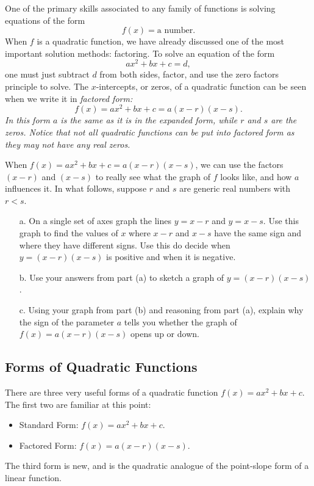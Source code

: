 \par

One of the primary skills associated to any family of functions is solving equations of the form
\[
f(x) = \mbox{a number}.
\]
When $f$ is a quadratic function, we have already discussed one of the most important solution methods: factoring. To solve an equation of the form
\[
ax^2+bx+c = d,
\]
one must just subtract $d$ from both sides, factor, and use the zero factors principle to solve. The $x$-intercepts, or zeros, of a quadratic function can be seen when we write it in \it{factored form}\normalfont:
\[
f(x) = ax^2 + bx+c = a(x-r)(x-s).
\]
In this form $a$ is the same as it is in the expanded form, while $r$ and $s$ are the zeros. Notice that not all quadratic functions can be put into factored form as they may not have any real zeros.

\par
   
\begin{question} When $f(x) = ax^2 + bx + c = a(x-r)(x-s)$, we can use the factors $(x-r)$ and $(x-s)$ to really see what the graph of $f$ looks like, and how $a$ influences it. In what follows, suppose $r$ and $s$ are generic real numbers with $r<s$.
\begin{enumerate}
\item[a.] On a single set of axes graph the lines $y = x-r$ and $y = x-s$. Use this graph to find the values of $x$ where $x-r$ and $x-s$ have the same sign and where they have different signs. Use this do decide when $y=(x-r)(x-s)$ is positive and when it is negative.
\item[b.] Use your answers from part (a) to sketch a graph of $y = (x-r)(x-s)$.
\item[c.] Using your graph from part (b) and reasoning from part (a), explain why the sign of the parameter $a$ tells you whether the graph of $f(x) = a(x-r)(x-s)$ opens up or down.
\end{enumerate}
\end{question}   

\subsection{Forms of Quadratic Functions}

There are three very useful forms of a quadratic function $f(x) = ax^2+bx+c$. The first two are familiar at this point:
\begin{itemize}
\item Standard Form: $f(x) = ax^2+bx+c$.
\item Factored Form: $f(x) = a(x-r)(x-s)$.
\end{itemize}
The third form is new, and is the quadratic analogue of the point-slope form of a linear function.\\

